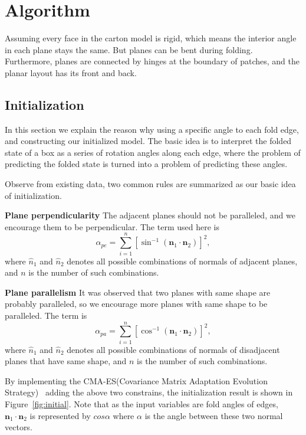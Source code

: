 \section{Algorithm}\label{sec:optimization}


Assuming every face in the carton model is rigid, which means the interior angle in each plane stays the same. But planes can be bent during folding. 
%
Furthermore, planes are connected by hinges at the boundary of patches, and the planar layout has its front and back.

\subsection{Initialization}\label{sec:initialization}
In this section we explain the reason why using a specific angle to each fold edge, and constructing our initialized model. The basic idea is to interpret the folded state of a box as a series of rotation angles along each edge, where the problem of predicting the folded state is turned into a problem of predicting these angles.

Observe from existing data, two common rules are summarized as our basic idea of initialization.

\noindent
\textbf{Plane perpendicularity} The adjacent planes should not be paralleled, and we encourage them to be perpendicular. The term used here is
\begin{equation}
\alpha_{pe} = \sum_{i = 1}^{n} [\sin^{-1}(\mathbf{n}_1 \cdot \mathbf{n}_2)]^{2},
\label{equ:perp}
\end{equation}
where $\hat{n}_1$ and $\hat{n}_2$ denotes all possible combinations of normals of adjacent planes, and $n$ is the number of such combinations.

\noindent
\textbf{Plane parallelism} It was observed that two planes with same shape are probably paralleled, so we encourage more planes with same shape to be paralleled. The term is
\begin{equation}
\alpha_{pa} = \sum_{i = 1}^{n} [\cos^{-1}(\mathbf{n}_1 \cdot \mathbf{n}_2)]^{2},
\label{equ:para}
\end{equation}
where $\hat{n}_1$ and $\hat{n}_2$ denotes all possible combinations of normals of disadjacent planes that have same shape,  and $n$ is the number of such combinations.

By implementing the CMA-ES(Covariance Matrix Adaptation Evolution Strategy)~\cite{CMAES} adding the above two constrains, the initialization result is shown in Figure~\ref{fig:initial}. Note that as the input variables are fold angles of edges, $\mathbf{n}_1 \cdot \mathbf{n}_2$ is represented by $cos\alpha$ where $\alpha$ is the angle between these two normal vectors. 

